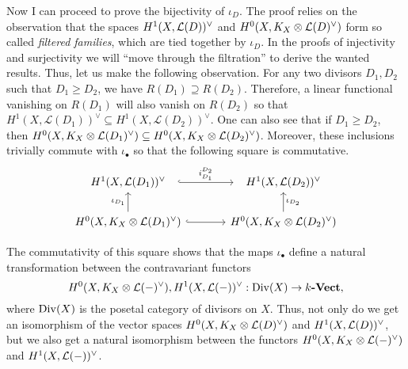 Now I can proceed to prove the bijectivity of $\iota_{D}$. The proof relies
on the observation that the spaces $H^1(X,\mathcal{L}(D))^{\vee}$ and $H^0(X,K_X\otimes\mathcal{L}(D)^{\vee})$ form so called
\emph{filtered families}, which are tied together by $\iota_{D}$. In the
proofs of injectivity and surjectivity we will ``move through the
filtration'' to derive the wanted results. Thus, let us make the following
observation. For any two divisors $D_{1}, D_{2}$ such that $D_{1}\geq D_{2}$,
we have $R(D_{1})\supseteq R(D_{2})$. Therefore, a linear functional
vanishing on $R(D_{1})$ will also vanish on $R(D_{2})$ so that
$H^{1}(X,\mathcal{L}(D_{1}))^{\vee}\subseteq H^{1}(X,\mathcal{L}(D_{2}))^\vee$.
One can also see that if $D_{1}\geq D_{2}$, then $H^0(X,K_X\otimes\mathcal{L}(D_{1})^{\vee})
\subseteq H^0(X,K_X\otimes\mathcal{L}(D_{2})^{\vee})$. Moreover, these inclusions trivially
commute with $\iota_{\bullet}$ so that the following square is commutative.
\begin{equation}\label{eq:iota_square}
  \begin{tikzcd}[column sep=large]
    \dual{D_{1}}\rar[hook, shorten=.7em, "i_{D_{1}}^{D_{2}}"] & \dual{D_{2}} \\
    \diffs{D_{1}}\uar{\iota_{D_{1}}}\rar[hook]
    & \diffs{D_{2}}\uar["\iota_{D_{2}}"']
  \end{tikzcd}
\end{equation}
\begin{cat}
  The commutativity of this square shows that the maps $\iota_{\bullet}$
  define a natural transformation between the contravariant functors
  \[
    H^0(X,K_X\otimes\mathcal{L}(-)^{\vee}),H^1(X,\mathcal{L}(-))^{\vee}:\operatorname{Div}(X)\to k\textbf{-Vect},
  \]
  where $\operatorname{Div}(X)$ is the posetal category of divisors on $X$.
  Thus, not only do we get an isomorphism of the vector spaces
  $H^0(X,K_X\otimes\mathcal{L}(D)^{\vee})$ and $H^1(X,\mathcal{L}(D))^{\vee}$, but we also get a natural isomorphism
  between the functors $H^0(X,K_X\otimes\mathcal{L}(-)^{\vee})$ and $H^1(X,\mathcal{L}(-))^{\vee}$.
\end{cat}

